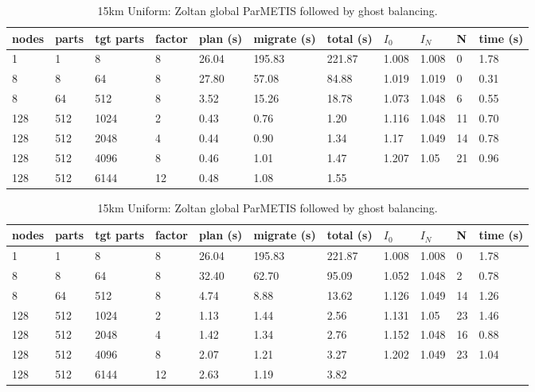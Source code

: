 \documentclass[a4paper]{article}
\begin{document}
\begin{table}
\caption{\label{tab:15kmlg}15km Uniform: Zoltan local ParMETIS followed by ghost balancing.}
\begin{tabular}{  l | l | l | l | l | l | l | l | l | l | l }
    \hline
    nodes & parts & tgt parts & factor & plan (s) & migrate (s) & total (s) & $I_0$ & $I_N$ & N & time (s) \\ \hline
    1 & 1 & 8 & 8 & 26.04 & 195.83 & 221.87 & 1.008 & 1.008 & 0 & 1.78 \\
    8 & 8 & 64 & 8 & 27.80 & 57.08 & 84.88 & 1.019 & 1.019 & 0 & 0.31 \\
    8 & 64 & 512 & 8 & 3.52 & 15.26 & 18.78 & 1.073 & 1.048 & 6 & 0.55 \\
    128 & 512 & 1024 & 2 & 0.43 & 0.76 & 1.20 & 1.116 & 1.048 & 11 & 0.70 \\
    128 & 512 & 2048 & 4 & 0.44 & 0.90 & 1.34 & 1.17 & 1.049 & 14 & 0.78 \\
    128 & 512 & 4096 & 8 & 0.46 & 1.01 & 1.47 & 1.207 & 1.05 & 21 & 0.96 \\
    128 & 512 & 6144 & 12 & 0.48 & 1.08 & 1.55 &  &  &  &  \\
\end{tabular}

\caption{\label{tab:15kmgg}15km Uniform: Zoltan global ParMETIS followed by ghost balancing.}
\begin{tabular}{  l | l | l | l | l | l | l | l | l | l | l }
    \hline
    nodes & parts & tgt parts & factor & plan (s) & migrate (s) & total (s) & $I_0$ & $I_N$ & N & time (s) \\ \hline
      1 & 1 & 8 & 8 & 26.04 & 195.83 & 221.87 & 1.008 & 1.008 & 0 & 1.78 \\
      8 & 8 & 64 & 8 & 32.40 & 62.70 & 95.09 & 1.052 & 1.048 & 2 & 0.78 \\
      8 & 64 & 512 & 8 & 4.74 & 8.88 & 13.62 & 1.126 & 1.049 & 14 & 1.26 \\
      128 & 512 & 1024 & 2 & 1.13 & 1.44 & 2.56 & 1.131 & 1.05 & 23 & 1.46 \\
      128 & 512 & 2048 & 4 & 1.42 & 1.34 & 2.76 & 1.152 & 1.048 & 16 & 0.88 \\
      128 & 512 & 4096 & 8 & 2.07 & 1.21 & 3.27 & 1.202 & 1.049 & 23 & 1.04 \\
      128 & 512 & 6144 & 12 & 2.63 & 1.19 & 3.82 &  &  &  & \  \\
\end{tabular}


\end{table}
\end{document}
